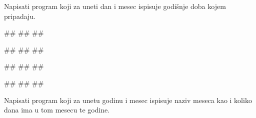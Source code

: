 \begin{Exercise}[label=v1.2_12] 
Napisati program koji za uneti dan i mesec ispisuje godišnje doba kojem pripadaju. 

\begin{miditest}
\begin{upotreba}{1}
#\naslovInt#
##
##
\end{upotreba}
\end{miditest}
\begin{miditest}
\begin{upotreba}{2}
#\naslovInt#
##
##
\end{upotreba}
\end{miditest}

\begin{miditest}
\begin{upotreba}{3}
#\naslovInt#
##
##
\end{upotreba}
\end{miditest}
\begin{miditest}
\begin{upotreba}{4}
#\naslovInt#
##
##
\end{upotreba}
\end{miditest}

\end{Exercise}
\ifresenja
 \begin{Answer}[ref=v1.2_12]
\end{Answer}
\fi





\begin{Exercise}[label=v1.2_17] 
Napisati program koji za unetu godinu i mesec ispisuje naziv meseca kao i koliko dana ima u tom mesecu te godine.

\end{Exercise}
\ifresenja
 \begin{Answer}[ref=v1.2_17]
\end{Answer}
\fi





